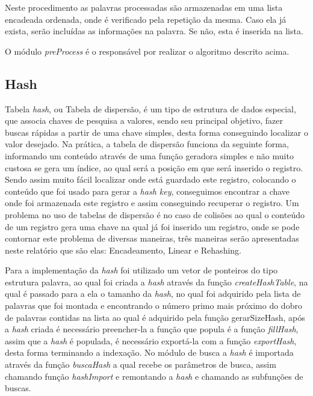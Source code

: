 \documentclass[
	11pt,				%
	oneside,			%
	a4paper,			%
	english,			%
	brazil,				%
	]{article}
\begin{document}
Neste procedimento as palavras processadas são armazenadas em uma lista encadeada ordenada, onde é verificado pela repetição da mesma. Caso ela já exista, serão incluídas as informações na palavra. Se não, esta é inserida na lista.

O módulo \textit{preProcess} é o responsável por realizar o algoritmo descrito acima.

\subsection{Hash}
Tabela \textit{hash}, ou Tabela de dispersão, é um tipo de estrutura de dados especial, que associa chaves de pesquisa a valores, sendo seu principal objetivo, fazer buscas rápidas a partir de uma chave simples, desta forma conseguindo localizar o valor desejado. Na prática, a tabela de dispersão funciona da seguinte forma, informando um conteúdo através de uma função geradora simples e não muito custosa se gera um índice, ao qual será a posição em que será inserido o registro. Sendo assim muito fácil localizar onde está guardado este registro, colocando o conteúdo que foi usado para gerar a \textit{hash key}, conseguimos encontrar a chave onde foi armazenada este registro e assim conseguindo recuperar o registro. Um problema no uso de tabelas de dispersão é no caso de colisões ao qual o conteúdo de um registro gera uma chave na qual já foi inserido um registro, onde se pode contornar este problema de diversas maneiras, três maneiras serão apresentadas neste relatório que são elas: Encadeamento, Linear e Rehashing. \cite{pesqsec}

Para a implementação da \textit{hash} foi utilizado um vetor de ponteiros do tipo estrutura palavra, ao qual foi criada a \textit{hash} através da função \textit{createHashTable}, na qual é passado para a ela o tamanho da \textit{hash}, no qual foi adquirido pela lista de palavras que foi montada e encontrando o número primo mais próximo do dobro de palavras contidas na lista ao qual é adquirido pela função gerarSizeHash, após a \textit{hash} criada é necessário preencher-la a função que popula é a função \textit{fillHash}, assim que a \textit{hash} é populada, é necessário exportá-la com a função \textit{exportHash}, desta forma terminando a indexação. No módulo de busca a \textit{hash} é importada através da função \textit{buscaHash} a qual recebe os parâmetros de busca, assim chamando função \textit{hashImport} e remontando a \textit{hash} e chamando as subfunções de buscas.
\end{document}
